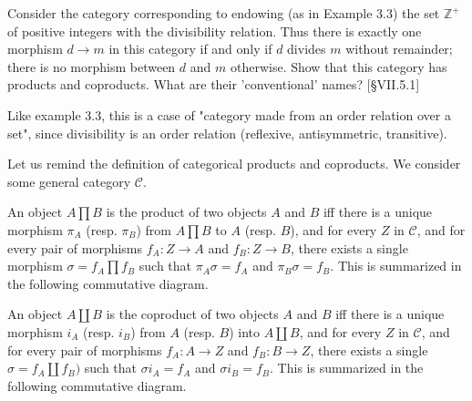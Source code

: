 \documentclass[12pt, letterpaper, twoside]{report}
\begin{document}
Consider the category corresponding to endowing (as in Example 3.3) the set $\mathbb{Z}^+$ of positive integers with the divisibility relation. Thus there is exactly one morphism $d \to m$ in this category if and only if $d$ divides $m$ without remainder; there is no morphism between $d$ and $m$ otherwise. Show that this category has products and coproducts. What are their 'conventional' names? [§VII.5.1]

Like example 3.3, this is a case of "category made from an order relation over a set", since divisibility is an order relation (reflexive, antisymmetric, transitive).

Let us remind the definition of categorical products and coproducts. We consider some general category $\mathcal{C}$.

An object $A \prod B$ is the product of two objects $A$ and $B$ iff there is a unique morphism $\pi_A$ (resp. $\pi_B$) from $A \prod B$ to $A$ (resp. $B$), and for every $Z$ in $\mathcal{C}$, and for every pair of morphisms $f_A : Z \to A$ and $f_B : Z \to B$, there exists a single morphism $\sigma = f_A \prod f_B$ such that $\pi_A \sigma = f_A$ and $\pi_B \sigma = f_B$. This is summarized in the following commutative diagram.


An object $A \coprod B$ is the coproduct of two objects $A$ and $B$ iff there is a unique morphism $i_A$ (resp. $i_B$) from $A$ (resp. $B$) into $A \coprod B$, and for every $Z$ in $\mathcal{C}$, and for every pair of morphisms $f_A : A \to Z$ and $f_B : B \to Z$, there exists a single $\sigma = f_A \coprod f_B)$ such that $\sigma i_A = f_A$ and $\sigma i_B = f_B$. This is summarized in the following commutative diagram.

\end{document}
